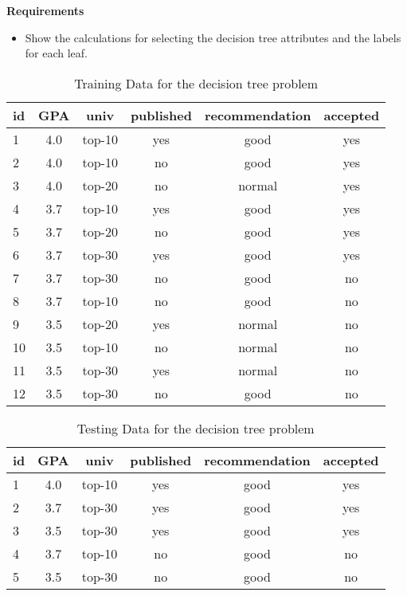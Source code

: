\textbf{Requirements}
\begin{itemize}
    \item Show the calculations for selecting the decision tree attributes and the labels for each leaf.
\end{itemize}

\begin{table}[!h]
    \centering
    \label{tab:dt}
    \begin{tabular}{l|cccc|c}
        \hline
        
        \hline
        {\bf id} & {\bf GPA} & {\bf univ}  & {\bf published} & {\bf recommendation} & {\bf accepted} \\ \hline
        1 & 4.0 &  top-10 &  yes &  good & yes  \\ 
        2& 4.0&  top-10&  no&  good& yes  \\ 
        3& 4.0&  top-20&  no&  normal&  yes  \\ 
        4& 3.7&  top-10&  yes&  good&  yes  \\ 
        5& 3.7&  top-20&  no&  good&  yes  \\ 
        6& 3.7&  top-30&  yes&  good&  yes  \\ 
        7& 3.7&  top-30&  no&  good& no   \\ 
        8& 3.7&  top-10&  no&  good& no   \\ 
        9& 3.5&  top-20&  yes&  normal& no   \\ 
        10& 3.5&  top-10&  no&  normal& no   \\ 
        11& 3.5&  top-30&  yes&  normal& no  \\ 
        12& 3.5&  top-30&  no&  good& no  \\ 
        \hline
        
        \hline
    \end{tabular}
    \caption{Training Data for the decision tree problem}
\end{table}

\begin{table}[!h]
    \centering
    \label{tab:dt-test}
    \begin{tabular}{l|cccc|c}
        \hline
        
        \hline
        {\bf id} & {\bf GPA} & {\bf univ}  & {\bf published} & {\bf recommendation} & {\bf accepted} \\ \hline
        1& 4.0 &  top-10 &  yes &  good & yes  \\ 
        2& 3.7&  top-30&  yes&  good&  yes  \\
        3& 3.5&  top-30&  yes&  good&  yes  \\      
        4& 3.7&  top-10&  no&  good& no   \\ 
        5& 3.5&  top-30&  no&  good& no  \\ 
        \hline
        
        \hline
    \end{tabular}
    \caption{Testing Data for the decision tree problem}
\end{table}

